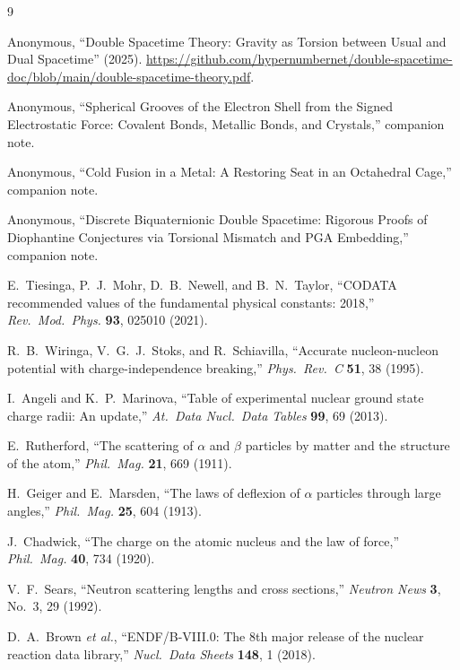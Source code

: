 \documentclass[a4paper]{article}
\begin{document}
\begin{thebibliography}{9}

Anonymous,
``Double Spacetime Theory: Gravity as Torsion between Usual and Dual Spacetime'' (2025).
\url{https://github.com/hypernumbernet/double-spacetime-doc/blob/main/double-spacetime-theory.pdf}.

Anonymous,
``Spherical Grooves of the Electron Shell from the Signed Electrostatic Force: Covalent Bonds, Metallic Bonds, and Crystals,''
companion note.

Anonymous,
``Cold Fusion in a Metal: A Restoring Seat in an Octahedral Cage,''
companion note.

Anonymous,
``Discrete Biquaternionic Double Spacetime: Rigorous Proofs of Diophantine Conjectures via Torsional Mismatch and PGA Embedding,''
companion note.

E.~Tiesinga, P.~J.~Mohr, D.~B.~Newell, and B.~N.~Taylor,
``CODATA recommended values of the fundamental physical constants: 2018,''
\textit{Rev.\ Mod.\ Phys.} \textbf{93}, 025010 (2021).

R.~B.~Wiringa, V.~G.~J.~Stoks, and R.~Schiavilla,
``Accurate nucleon-nucleon potential with charge-independence breaking,''
\textit{Phys.\ Rev.\ C} \textbf{51}, 38 (1995).

I.~Angeli and K.~P.~Marinova,
``Table of experimental nuclear ground state charge radii: An update,''
\textit{At.\ Data Nucl.\ Data Tables} \textbf{99}, 69 (2013).

E.~Rutherford,
``The scattering of \(\alpha\) and \(\beta\) particles by matter and the structure of the atom,''
\textit{Phil.\ Mag.} \textbf{21}, 669 (1911).

H.~Geiger and E.~Marsden,
``The laws of deflexion of \(\alpha\) particles through large angles,''
\textit{Phil.\ Mag.} \textbf{25}, 604 (1913).

J.~Chadwick,
``The charge on the atomic nucleus and the law of force,''
\textit{Phil.\ Mag.} \textbf{40}, 734 (1920).

V.~F.~Sears,
``Neutron scattering lengths and cross sections,''
\textit{Neutron News} \textbf{3}, No.~3, 29 (1992).

D.~A.~Brown \textit{et al.},
``ENDF/B-VIII.0: The 8th major release of the nuclear reaction data library,''
\textit{Nucl.\ Data Sheets} \textbf{148}, 1 (2018).

\end{thebibliography}
\end{document}
